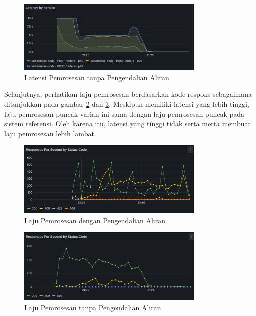 \pagebreak

\begin{figure}[htbp]
    \centering
    \includegraphics[width=0.8\textwidth]{resources/chapter-4/latency-nofc-pg-stress-0.png}
    \caption{Latensi Pemrosesan tanpa Pengendalian Aliran}
    \label{fig:latency-nofc}
\end{figure}

Selanjutnya, perhatikan laju pemrosesan berdasarkan kode respons sebagaimana ditunjukkan pada gambar \ref{fig:rps-fc-pg-stress-0} dan \ref{fig:rps-nofc-pg-stress-0}. Meskipun memiliki latensi yang lebih tinggi, laju pemrosesan puncak varian ini sama dengan laju pemrosesan puncak pada sistem referensi. Oleh karena itu, latensi yang tinggi tidak serta merta membuat laju pemrosesan lebih lambat.

\begin{figure}[htbp]
    \centering
    \includegraphics[width=0.8\textwidth]{resources/chapter-4/rps-fc-pg-stress-0.png}
    \caption{Laju Pemrosesan dengan Pengendalian Aliran}
    \label{fig:rps-fc-pg-stress-0}
\end{figure}

\begin{figure}[htbp]
    \centering
    \includegraphics[width=0.8\textwidth]{resources/chapter-4/rps-nofc-pg-stress-0.png}
    \caption{Laju Pemrosesan tanpa Pengendalian Aliran}
    \label{fig:rps-nofc-pg-stress-0}
\end{figure}

